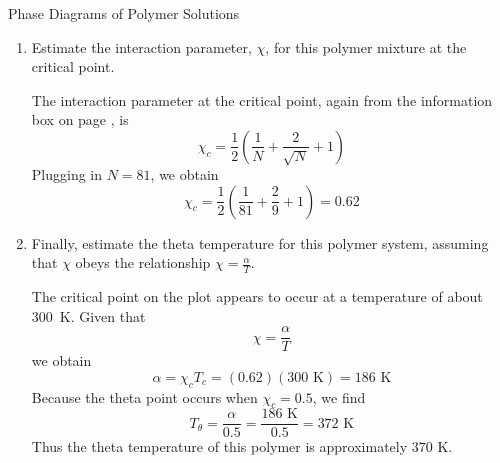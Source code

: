\begin{activity}{Phase Diagrams of Polymer Solutions}
\begin{exercises}
\begin{enumerate}
				\emph{Hint: start by finding the composition at the critical point, $\phi_{1,c}$.}
			
				\begin{solution}{}
					The composition at the critical point, $\phi_{1,c}$, appears to be approximately 0.90. From the information box on page \pageref{\labelbase:eqn:phi1c}, we know that
					\begin{equation*}
						\phi_{1,c} = \frac{\sqrt{N}}{1+\sqrt{N}}
					\end{equation*}
					Solving for $N$, we obtain
					\begin{equation*}
						N = \left(\frac{\phi_{1,c}}{1-\phi_{1,c}}\right)^2 = \left(\frac{0.9}{0.1}\right)^2 = 81
					\end{equation*}
					Thus the degree of polymerization of the polymer is approximately 80.
				\end{solution}
				
			\item Estimate the interaction parameter, $\chi$, for this polymer mixture at the critical point.
			
				\begin{solution}{}
					The interaction parameter at the critical point, again from the information box on page \pageref{\labelbase:eqn:phi1c}, is
					\begin{equation*}
						\chi_c = \frac{1}{2}\left(\frac{1}{N} + \frac{2}{\sqrt{N}} + 1\right)
					\end{equation*}
					Plugging in $N=81$, we obtain
					\begin{equation*}
						\chi_c = \frac{1}{2}\left(\frac{1}{81} + \frac{2}{9} +1\right) = 0.62
					\end{equation*}
				\end{solution}
				
			
			\item Finally, estimate the theta temperature for this polymer system, assuming that $\chi$ obeys the relationship $\chi = \frac{\alpha}{T}$.
			
				\begin{solution}{}
					
					The critical point on the plot appears to occur at a temperature of about 300~K.  Given that
					\begin{equation*}
						\chi = \frac{\alpha}{T}
					\end{equation*}
					we obtain
					\begin{equation*}
						\alpha = \chi_c T_c = (0.62)(300\text{ K}) = 186\text{ K}
					\end{equation*}
					Because the theta point occurs when $\chi_c = 0.5$, we find
					\begin{equation*}
						T_\theta = \frac{\alpha}{0.5} = \frac{186\text{ K}}{0.5} = 372\text{ K}
					\end{equation*}
					Thus the theta temperature of this polymer is approximately 370 K.
					

\end{solution}
\end{enumerate}
\end{exercises}
\end{activity}

